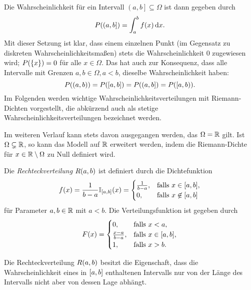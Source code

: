 \documentclass{lecture}
\begin{document}
    Die Wahrscheinlichkeit für ein Intervall \(\left(a, b\right] \subseteq \Omega\) ist dann gegeben durch
    \[
        P\parentheses*{\left(a, b\right]} = \int_a^b f\parentheses*{x}\d x.
    \]
    Mit dieser Setzung ist klar, dass einem einzelnen Punkt (im Gegensatz zu diskreten Wahrscheinlichkeitsmaßen) stets die Wahrscheinlichkeit \(0\) zugewiesen wird; \(P\parentheses*{\braces*{x}} = 0\) für alle \(x \in \Omega\).
    Das hat auch zur Konsequenz, dass alle Intervalle mit Grenzen \(a, b \in \Omega, a < b\), dieselbe Wahrscheinlichkeit haben:
    \[
        P\parentheses*{\parentheses*{a, b}} = P\parentheses*{\brackets*{a, b}} = P\parentheses*{\left(a, b\right]} = P\parentheses*{\left[a, b\right)}.
    \]
    Im Folgenden werden wichtige Wahrscheinlichkeitsverteilungen mit Riemann-Dichten vorgestellt, die abkürzend auch als stetige Wahrscheinlichkeitsverteilungen bezeichnet werden.

    \begin{remark}
        Im weiteren Verlauf kann stets davon ausgegangen werden, das \(\Omega = \R\) gilt.
        Ist \(\Omega \subsetneq \R\), so kann das Modell auf \(\R\) erweitert werden, indem die Riemann-Dichte für \(x \in \R \setminus \Omega\) zu Null definiert wird.
    \end{remark}

    \begin{definition}
        Die \emph{Rechteckverteilung} \(R\parentheses*{a, b}\) ist definiert durch die Dichtefunktion
        \[
            f\parentheses*{x} = \frac{1}{b - a}\mathbb{I}_{\brackets*{a, b}}\parentheses*{x} = \begin{cases}
                \frac{1}{b - a}, & \text{falls }x \in \brackets*{a, b},\\
                0, & \text{falls }x \not\in \brackets*{a, b}
            \end{cases}
        \]
        für Parameter \(a, b \in \R\) mit \(a < b\).
        Die Verteilungsfunktion ist gegeben durch
        \[
            F\parentheses*{x} = \begin{cases}
                0, & \text{falls }x < a,\\
                \frac{x - a}{b - a}, & \text{falls }x \in \brackets*{a, b},\\
                1, & \text{falls }x > b.
            \end{cases}
        \]
    \end{definition}

    Die Rechteckverteilung \(R\parentheses*{a, b}\) besitzt die Eigenschaft, dass die Wahrscheinlichkeit eines in \(\brackets*{a, b}\) enthaltenen Intervalls nur von der Länge des Intervalls nicht aber von dessen Lage abhängt.
\end{document}
